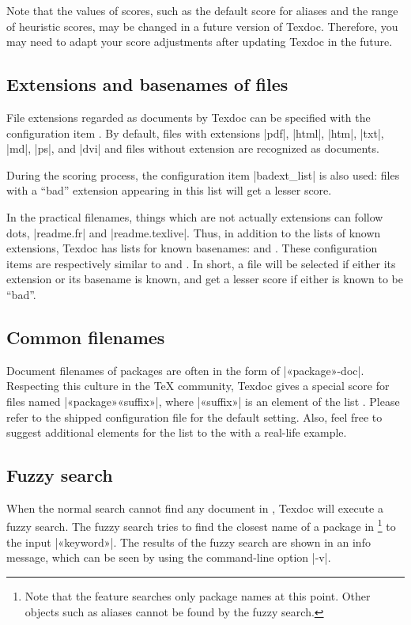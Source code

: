\documentclass[draft]{texdoc-doc}
\begin{document}
Note that the values of scores, such as the default score for aliases and the
range of heuristic scores, may be changed in a future version of Texdoc.
Therefore, you may need to adapt your score adjustments after updating Texdoc
in the future.

\subsection{Extensions and basenames of files}
\label{sec:ext}

File extensions regarded as documents by Texdoc can be specified with the
configuration item . By default, files with extensions |pdf|,
|html|, |htm|, |txt|, |md|, |ps|, and |dvi| and files without extension are
recognized as documents.

During the scoring process, the configuration item |badext_list| is also used:
files with a ``bad'' extension appearing in this list will get a lesser score.

In the practical filenames, things which are not actually extensions can follow
dots, \eg |readme.fr| and |readme.texlive|. Thus, in addition to the lists of
known extensions, Texdoc has lists for known basenames:  and
. These configuration items are respectively similar to
 and . In short, a file will be selected if
either its extension or its basename is known, and get a lesser score if either
is known to be ``bad''.

\subsection{Common filenames}
\label{sec:common-names}

Document filenames of packages are often in the form of |«package»-doc|.
Respecting this culture in the {\TeX} community, Texdoc gives a special score
for files named |«package»«suffix»|, where |«suffix»| is an element of the list
. Please refer to the shipped configuration file for the
default setting. Also, feel free to suggest additional elements for the list to
the {\TexdocML} with a real-life example.

\subsection{Fuzzy search}
\label{sec:fuzzy}

When the normal search cannot find any document in {\TL}, Texdoc will execute a
fuzzy search. The fuzzy search tries to find the closest name of a package in
{\TL}\footnote{Note that the feature searches only package names at this point.
Other objects such as aliases cannot be found by the fuzzy search.} to the
input |«keyword»|. The results of the fuzzy search are shown in an info
message, which can be seen by using the command-line option |-v|.
\end{document}
